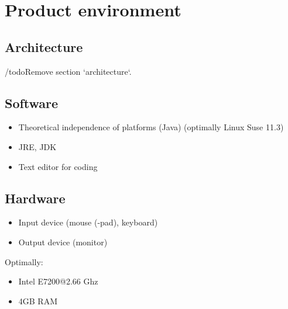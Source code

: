 \section{Product environment}

\subsection{Architecture} /todo{Remove section `architecture`.}

\subsection{Software}
\begin{itemize}
\item Theoretical independence of platforms (Java) (optimally Linux Suse 11.3)
\item JRE, JDK
\item Text editor for coding
\end{itemize}

\subsection{Hardware}
\begin{itemize}
\item Input device (mouse (-pad), keyboard)
\item Output device (monitor)
\end{itemize}
Optimally:
\begin{itemize}
\item Intel E7200@2.66 Ghz
\item 4GB RAM
\end{itemize}
